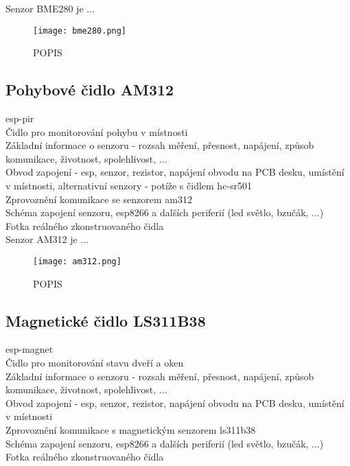 Senzor BME280 je ...

\begin{figure}[H]
  \centering
  \texttt{[image: bme280.png]}
  \caption{POPIS}
  \label{fig:hardware_components:LABEL}
\end{figure}

\subsection{Pohybové čidlo AM312}

esp-pir \\
Čidlo pro monitorování pohybu v místnosti \\
Základní informace o senzoru - rozsah měření, přesnost, napájení, způsob komunikace, životnost, spolehlivost, ... \\
Obvod zapojení - esp, senzor, rezistor, napájení obvodu na PCB desku, umístění v místnosti, alternativní senzory - potíže s čidlem hc-sr501\\
Zprovoznění komunikace se senzorem am312 \\
Schéma zapojení senzoru, esp8266 a dalších periferií (led světlo, bzučák, ...) \\
Fotka reálného zkonstruovaného čidla \\

Senzor AM312 je ...

\begin{figure}[H]
  \centering
  \texttt{[image: am312.png]}
  \caption{POPIS}
  \label{fig:hardware_components:LABEL}
\end{figure}

\subsection{Magnetické čidlo LS311B38}

esp-magnet \\
Čidlo pro monitorování stavu dveří a oken \\
Základní informace o senzoru - rozsah měření, přesnost, napájení, způsob komunikace, životnost, spolehlivost, ... \\
Obvod zapojení - esp, senzor, rezistor, napájení obvodu na PCB desku, umístění v místnosti \\
Zprovoznění komunikace s magnetickým senzorem ls311b38 \\
Schéma zapojení senzoru, esp8266 a dalších periferií (led světlo, bzučák, ...) \\
Fotka reálného zkonstruovaného čidla \\

